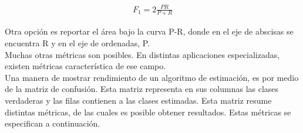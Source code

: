 \begin{align}
  F_1 = 2\frac{PR}{P+R}
\end{align}

\indent Otra opción es reportar el área bajo la curva P-R, donde en el eje de abscisas se encuentra R y en el eje de
ordenadas, P. \\
\indent Muchas otras métricas son posibles. En distintas aplicaciones especializadas, existen métricas
característica de ese campo. \\
\indent Una manera de mostrar rendimiento de un algoritmo de estimación, es por medio de la matriz de confusión.
Esta matriz representa en sus columnas las clases verdaderas y las filas contienen a las clases estimadas. Esta
matriz resume distintas métricas, de las cuales es posible obtener resultados. Estas métricas se especifican a
continuación.

